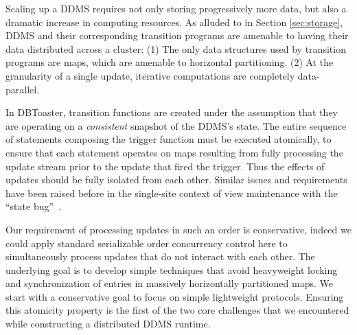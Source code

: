 Scaling up a DDMS requires not only storing progressively more data, but also a
dramatic increase in computing resources.  As alluded to in Section
\ref{sec:storage}, DDMS and their corresponding transition programs are amenable
to having their data distributed across a cluster: (1) The only data structures
used by transition programs are maps, which are amenable to horizontal
partitioning.  (2) At the granularity of a single update, iterative computations
are completely data-parallel. 

In DBToaster, transition functions are created under the assumption that they
are operating on a \textit{consistent} snapshot of the DDMS's state. The entire
sequence of statements composing the trigger function must be executed
atomically, to ensure that each statement operates on maps resulting from fully
processing the update stream prior to the update that fired the trigger.
Thus the effects of updates should be fully isolated from each other.
Similar issues and requirements have been raised before in the single-site
context of view maintenance with the ``state bug''~\cite{colby-sigmod:96}.

Our requirement of processing updates in such an order is conservative, indeed
we could apply standard serializable order concurrency control here to
simultaneously process updates that do not interact with each other. The
underlying goal is to develop simple techniques that avoid heavyweight locking
and synchronization of entries in massively horizontally partitioned maps. 
We start with a conservative goal to focus on simple lightweight protocols.
Ensuring this atomicity property is the first of the two core challenges that we
encountered while constructing a distributed DDMS runtime.

